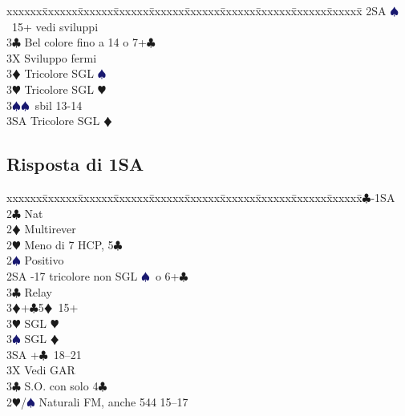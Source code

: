 \documentclass[a4paper,italian]{article}
\newcommand{\BC}{\textcolor{OliveGreen}{$\clubsuit$}}
\newcommand{\BD}{\textcolor{RedOrange}{$\vardiamondsuit$}}
\newcommand{\BH}{\textcolor{Red2}{$\varheartsuit${}}}
\newcommand{\BS}{\textcolor{MidnightBlue}{$\spadesuit${}}}
\newenvironment{bidtable}
{\begin{tabbing}

    xxxxxx\=xxxxxx\=xxxxxx\=xxxxxx\=xxxxxx\=xxxxxx\=xxxxxx\=xxxxxx\=xxxxxx\=xxxxxx\=\kill}
{\end{tabbing} }%
\begin{document}
\begin{multicols}{2}
\begin{bidtable}
                                        2SA \BS\ 15+ vedi sviluppi\\
                                        3\BC \> Bel colore fino a 14 o 7+\BC\+\\
                                        3X \> Sviluppo fermi\-\\
                                        3\BD \> Tricolore SGL \BS \\
                                        3\BH \> Tricolore SGL \BH \\
                                        3\BS {}\BS\ sbil 13-14\\
                                        3SA \> Tricolore SGL \BD \-
                                    \end{bidtable}
                                    \subsection{Risposta di 1SA}
                                    \begin{bidtable}
                                        1\BC-1SA\+\\
                                        2\BC \> Nat\\
                                        2\BD \> Multirever\+\\
                                        2\BH \> Meno di 7 HCP, 5\BC \\
                                        2\BS \> Positivo\+\\
                                        2SA -17 tricolore non SGL \BS\ o 6+\BC \+\\
                                        3\BC \> Relay\+\\
                                        3\BD {}+\BC 5\BD\ 15+\\
                                        3\BH \> SGL \BH \\
                                        3\BS \> SGL \BD \\
                                        3SA +\BC\ 18--21\-\-\\
                                        3X \> Vedi GAR\-\\
                                        3\BC \> S.O. con solo 4\BC\-\\
                                        2\BH/\BS \> Naturali FM, anche 544 15--17\+\\

\end{bidtable}
\end{multicols}
\end{document}
